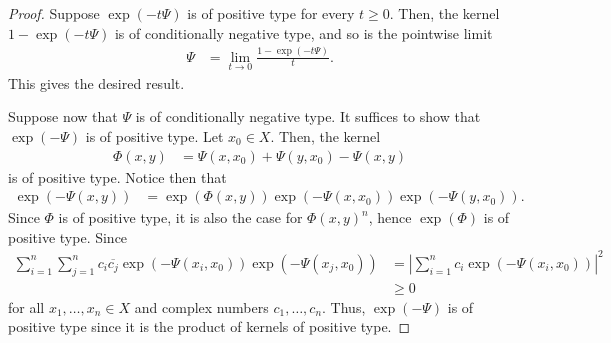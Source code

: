 \documentclass[10pt]{mypackage}
\begin{document}
\begin{proof}
  Suppose $\exp\left( -t\Psi \right)$ is of positive type for every $t\geq 0$. Then, the kernel $1-\exp\left( -t\Psi \right)$ is of conditionally negative type, and so is the pointwise limit
  \begin{align*}
    \Psi &= \lim_{t\to 0} \frac{1-\exp\left( -t\Psi \right)}{t}.
  \end{align*}
  This gives the desired result.

  Suppose now that $\Psi$ is of conditionally negative type. It suffices to show that $\exp\left( -\Psi \right)$ is of positive type. Let $x_0\in X$. Then, the kernel
  \begin{align*}
    \Phi\left( x,y \right) &= \Psi\left( x,x_0 \right) + \Psi\left( y,x_0 \right)-\Psi\left( x,y \right)
  \end{align*}
  is of positive type. Notice then that
  \begin{align*}
    \exp\left( -\Psi\left( x,y \right) \right) &= \exp\left( \Phi\left( x,y \right) \right)\exp\left( -\Psi\left( x,x_0 \right) \right)\exp\left( -\Psi\left( y,x_0 \right) \right).
  \end{align*}
  Since $\Phi$ is of positive type, it is also the case for $\Phi\left( x,y \right)^{n}$, hence $\exp\left( \Phi \right)$ is of positive type. Since
  \begin{align*}
    \sum_{i=1}^{n}\sum_{j=1}^{n} c_i \overline{c_j} \exp\left( -\Psi\left( x_i,x_0 \right) \right)\exp\left( -\Psi\left( x_j,x_0 \right) \right) &= \left\vert \sum_{i=1}^{n}c_i \exp\left( -\Psi\left( x_i,x_0 \right) \right) \right\vert^2\\
                                                                                                                                                                &\geq 0
  \end{align*}
  for all $x_1,\dots,x_n\in X$ and complex numbers $c_1,\dots,c_n$. Thus, $\exp\left( -\Psi \right)$ is of positive type since it is the product of kernels of positive type.
\end{proof}
\end{document}
